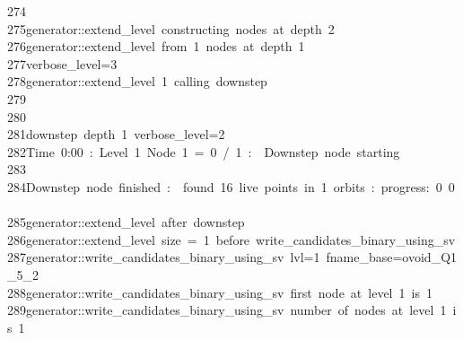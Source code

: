 \begin{tabbing}
274\>\\[0pt]
275\>generator::extend\_level\ constructing\ nodes\ at\ depth\ 2\\[0pt]
276\>generator::extend\_level\ from\ 1\ nodes\ at\ depth\ 1\\[0pt]
277\>verbose\_level=3\\[0pt]
278\>generator::extend\_level\ 1\ calling\ downstep\\[0pt]
279\>\\[0pt]
280\>\\[0pt]
281\>downstep\ depth\ 1\ verbose\_level=2\\[0pt]
282\>Time\ 0:00\ :\ Level\ 1\ Node\ 1\ =\ 0\ /\ 1\ :\ \ Downstep\ node\ starting\\[0pt]
283\>\\[0pt]
284\>Downstep\ node\ finished\ :\ \ found\ 16\ live\ points\ in\ 1\ orbits\ :\ progress:\ 0\ 0\ \ \\[0pt]
285\>generator::extend\_level\ after\ downstep\\[0pt]
286\>generator::extend\_level\ size\ =\ 1\ before\ write\_candidates\_binary\_using\_sv\\[0pt]
287\>generator::write\_candidates\_binary\_using\_sv\ lvl=1\ fname\_base=ovoid\_Q1\_5\_2\\[0pt]
288\>generator::write\_candidates\_binary\_using\_sv\ first\ node\ at\ level\ 1\ is\ 1\\[0pt]
289\>generator::write\_candidates\_binary\_using\_sv\ number\ of\ nodes\ at\ level\ 1\ is\ 1\\[0pt]

\end{tabbing}

